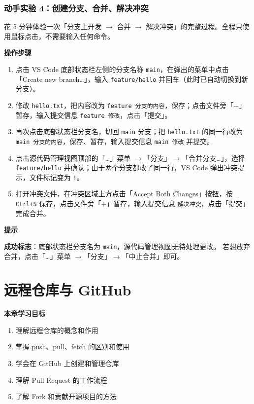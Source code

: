 \documentclass[12pt,a4paper,openany]{ctexbook}
\newenvironment{tipbox}{%
  \medskip
  \noindent\textbf{\faLightbulb\; 提示}
  \smallskip
}{%
  \medskip
}
\newenvironment{stepbox}{%
  \medskip
  \noindent\textbf{\faCogs\; 操作步骤}
  \smallskip
}{%
  \medskip
}
\begin{document}
\subsection*{动手实验 4：创建分支、合并、解决冲突}

花 5 分钟体验一次「分支上开发 $\to$ 合并 $\to$ 解决冲突」的完整过程。全程只使用鼠标点击，不需要输入任何命令。

\begin{stepbox}
\begin{enumerate}[leftmargin=1.5em]
  \item 点击 VS Code 底部状态栏左侧的分支名称 \texttt{main}，在弹出的菜单中点击「Create new branch…」，输入 \texttt{feature/hello} 并回车（此时已自动切换到新分支）。
  \item 修改 \texttt{hello.txt}，把内容改为 \texttt{feature 分支的内容}，保存；点击文件旁「+」暂存，输入提交信息 \texttt{feature 修改}，点击「提交」。
  \item 再次点击底部状态栏分支名，切回 \texttt{main} 分支；把 \texttt{hello.txt} 的同一行改为 \texttt{main 分支的内容}，保存、暂存，输入提交信息 \texttt{main 修改} 并提交。
  \item 点击源代码管理视图顶部的「…」菜单 $\to$「分支」$\to$「合并分支…」，选择 \texttt{feature/hello} 并确认；由于两个分支都改了同一行，VS Code 弹出冲突提示，文件标记变为 \texttt{!}。
  \item 打开冲突文件，在冲突区域上方点击「Accept Both Changes」按钮，按 \texttt{Ctrl+S} 保存，点击文件旁「+」暂存，输入提交信息 \texttt{解决冲突}，点击「提交」完成合并。
\end{enumerate}
\end{stepbox}

\begin{tipbox}
\textbf{成功标志}：底部状态栏分支名为 \texttt{main}，源代码管理视图无待处理更改。
若想放弃合并，点击「…」菜单 $\to$「分支」$\to$「中止合并」即可。
\end{tipbox}

\chapter{远程仓库与 GitHub}

\begin{infobox}
\textbf{本章学习目标}
\begin{enumerate}[leftmargin=1.5em]
  \item 理解远程仓库的概念和作用
  \item 掌握 push、pull、fetch 的区别和使用
  \item 学会在 GitHub 上创建和管理仓库
  \item 理解 Pull Request 的工作流程
  \item 了解 Fork 和贡献开源项目的方法
\end{enumerate}
\end{infobox}
\end{document}
